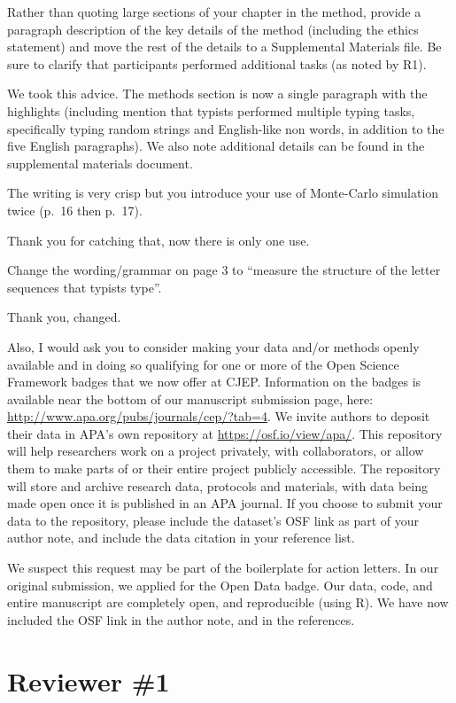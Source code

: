 \documentclass[draft]{article}
\begin{document}
\RC Rather than quoting large sections of your chapter in the method, provide a paragraph description of the key details of the method (including the ethics statement) and move the rest of the details to a Supplemental Materials file. Be sure to clarify that participants performed additional tasks (as noted by R1).

We took this advice. The methods section is now a single paragraph with the highlights (including mention that typists performed multiple typing tasks, specifically typing random strings and English-like non words, in addition to the five English paragraphs). We also note additional details can be found in the supplemental materials document.

\RC The writing is very crisp but you introduce your use of Monte-Carlo simulation twice (p.~16 then p.~17).

Thank you for catching that, now there is only one use.

\RC Change the wording/grammar on page 3 to ``measure the structure of the letter sequences that typists type''.

Thank you, changed.

\RC Also, I would ask you to consider making your data and/or methods openly available and in doing so qualifying for one or more of the Open Science Framework badges that we now offer at CJEP. Information on the badges is available near the bottom of our manuscript submission page, here: \url{http://www.apa.org/pubs/journals/cep/?tab=4}. We invite authors to deposit their data in APA's own repository at \url{https://osf.io/view/apa/}. This repository will help researchers work on a project privately, with collaborators, or allow them to make parts of or their entire project publicly accessible. The repository will store and archive research data, protocols and materials, with data being made open once it is published in an APA journal. If you choose to submit your data to the repository, please include the dataset's OSF link as part of your author note, and include the data citation in your reference list.

We suspect this request may be part of the boilerplate for action letters. In our original submission, we applied for the Open Data badge. Our data, code, and entire manuscript are completely open, and reproducible (using R). We have now included the OSF link in the author note, and in the references.

\hypertarget{reviewer-1}{%
\section{Reviewer \#1}\label{reviewer-1}}
\end{document}
